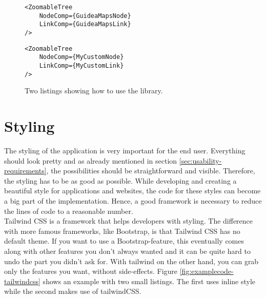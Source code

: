 \begin{figure}[H]
	\begin{minipage}{0.5\textwidth}
 		 \centering
		 \begin{verbatim}
<ZoomableTree
    NodeComp={GuideaMapsNode}
    LinkComp={GuideaMapsLink}
/>
		\end{verbatim}
		\label{lst:default-components}
	\end{minipage}
 	\begin{minipage}{0.5\textwidth}
  		\centering
  		\begin{verbatim}
<ZoomableTree
    NodeComp={MyCustomNode}
    LinkComp={MyCustomLink}
/>
		\end{verbatim}
		\label{lst:custom-components}
 	\end{minipage}
	\caption{Two listings showing how to use the library.}
	\label{fig:examplecode-library}
\end{figure}

\section{Styling}\label{sec:styling}
The styling of the application is very important for the end user. Everything should look pretty and as already mentioned in section \ref{sec:usability-requirements}, the possibilities should be straightforward and visible. Therefore, the styling has to be as good as possible. While developing and creating a beautiful style for applications and websites, the code for these styles can become a big part of the implementation. Hence, a good framework is necessary to reduce the lines of code to a reasonable number. \\

Tailwind CSS \cite{tailwind-css} is a framework that helps developers with styling. The difference with more famous frameworks, like Bootstrap, is that Tailwind CSS has no default theme. If you want to use a Bootstrap-feature, this eventually comes along with other features you don't always wanted and it can be quite hard to undo the part you didn't ask for. With tailwind on the other hand, you can grab only the features you want, without side-effects. Figure \ref{fig:examplecode-tailwindcss} shows an example with two small listings. The first uses inline style while the second makes use of tailwindCSS.\\

